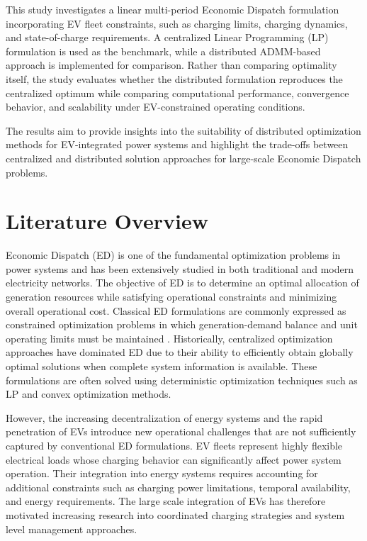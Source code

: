 \documentclass[12pt, a4paper]{article}
\begin{document}
This study investigates a linear multi-period Economic Dispatch formulation incorporating EV fleet constraints, such as charging limits, charging dynamics, and state-of-charge requirements. A centralized Linear Programming (LP) formulation is used as the benchmark, while a distributed ADMM-based approach is implemented for comparison. Rather than comparing optimality itself, the study evaluates whether the distributed formulation reproduces the centralized optimum while comparing computational performance, convergence behavior, and scalability under EV-constrained operating conditions.

The results aim to provide insights into the suitability of distributed optimization methods for EV-integrated power systems and highlight the trade-offs between centralized and distributed solution approaches for large-scale Economic Dispatch problems.

%
\section{Literature Overview}

Economic Dispatch (ED) is one of the fundamental optimization problems in power systems and has been extensively studied in both traditional and modern electricity networks. The objective of ED is to determine an 
optimal allocation of generation resources while satisfying operational constraints and minimizing overall operational cost. Classical ED formulations are commonly expressed as constrained optimization problems in which generation-demand balance and unit operating limits must be maintained \parencite{Conejo2010}. Historically, centralized optimization approaches have dominated ED due to their ability to efficiently obtain globally optimal solutions when complete system information is available. These formulations are often solved using deterministic optimization techniques such as LP and convex optimization methods.

However, the increasing decentralization of energy systems and the rapid penetration of EVs introduce new operational challenges that are not sufficiently captured by conventional ED formulations. 
EV fleets represent highly flexible electrical loads whose charging behavior can significantly affect power system operation. Their integration into energy systems requires accounting for additional constraints such as 
charging power limitations, temporal availability, and energy requirements. The large scale integration of EVs has therefore motivated increasing research into coordinated charging strategies and system level management approaches.
\end{document}
